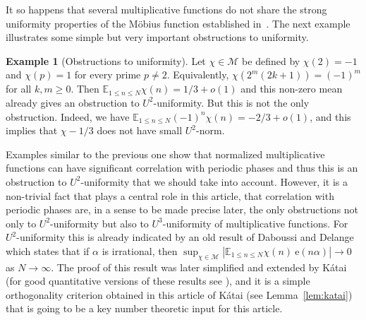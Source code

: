 \documentclass[11pt]{amsart}
\theoremstyle{definition}
\newtheorem*{example}{Example}
\begin{document}
It so happens that several multiplicative functions do not share the
strong uniformity properties of the M\"obius function established
in~\cite{GT12b}. The next example illustrates some simple but very
important obstructions to uniformity.
\begin{example}[Obstructions to uniformity]
Let $\chi\in{{\mathcal M}}$ be defined by $\chi(2)=-1$ and $\chi(p)=1$ for
every prime $p\neq 2$. Equivalently,  $\chi(2^m(2k+1))=(-1)^m$ for
all $k,m\geq 0$. Then ${{\mathbb E}}_{1\leq n\leq N}\chi(n)= 1/3+o(1)$ and this
non-zero mean already gives an obstruction to $U^2$-uniformity. But
this is not the only obstruction. Indeed,  we have ${{\mathbb E}}_{1\leq n\leq
N}(-1)^n\chi(n)=-2/3+o(1)$,
  and this  implies that  $\chi-1/3$ does not
 have small $U^2$-norm.
\end{example}
Examples similar to the previous one show that normalized
multiplicative functions can have significant correlation with
  periodic phases and thus this is an
  obstruction to
$U^2$-uniformity that we should  take   into account.
However, it  is a non-trivial fact that plays a central role in this
article, that correlation with periodic phases are, in a sense to
be made precise later, the only obstructions
 not only to $U^2$-uniformity but also to $U^3$-uniformity of multiplicative functions.
 For $U^2$-uniformity this is already
indicated by an old result of Daboussi and Delange~\cite{DD74, DD82} which states that
if $\alpha$ is irrational, then $ \sup_{\chi\in {{\mathcal M}}}|{{\mathbb E}}_{1\leq n\leq N}\chi(n) \ \! {\mathrm{e}}(n\alpha)|\to 0$ as $N\to \infty$. The proof of
this result was  later simplified and extended by K\'atai \cite{K86}
(for good quantitative versions of these results see \cite{BSZ12,
MV77}), and it is a simple  orthogonality criterion  obtained in
this article of K\'atai (see Lemma~\ref{lem:katai}) that is going to
be a key number theoretic input for this article.
\end{document}
